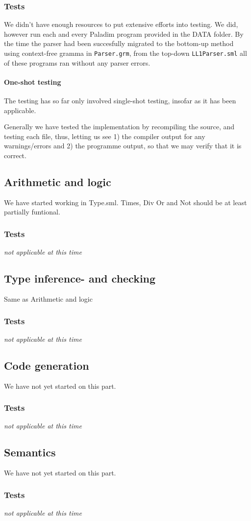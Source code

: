 \documentclass[11pt]{article}
\begin{document}
\subsubsection{Tests}
We didn't have enough resources to put extensive efforts into testing. We did,
however run each and every Paladim program provided in the DATA folder. By the
time the parser had been succesfully migrated to the bottom-up method using
context-free gramma in {\tt Parser.grm}, from the top-down {\tt LL1Parser.sml}
all of these programs ran without any parser errors.

\paragraph{One-shot testing}
The testing has so far only involved single-shot testing, insofar as it has
been applicable.

Generally we have tested the implementation by recompiling the source, and
testing each file, thus, letting us see 1) the compiler output for any
warnings/errors and 2) the programme output, so that we may verify that it
is correct.

\subsection{Arithmetic and logic}
We have started working in Type.sml. Times, Div Or and Not should be at least partially funtional.

\subsubsection{Tests}
{\it not applicable at this time}%

\subsection{Type inference- and checking}
Same as Arithmetic and logic

\subsubsection{Tests}
{\it not applicable at this time}%

\subsection{Code generation}
We have not yet started on this part.

\subsubsection{Tests}%
{\it not applicable at this time}%

\subsection{Semantics}
We have not yet started on this part.

\subsubsection{Tests}
{\it not applicable at this time}%
\end{document}
